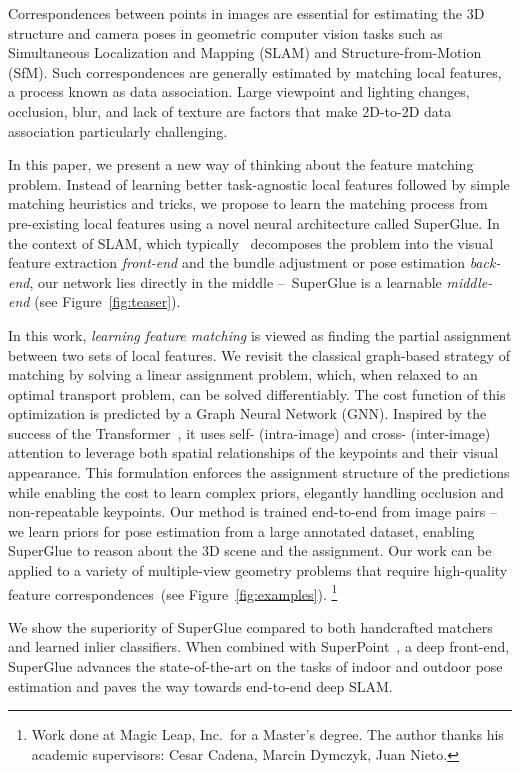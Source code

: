 \documentclass[10pt,twocolumn,letterpaper]{article}
\newcommand\blfootnote[1]{\begingroup
  \renewcommand\thefootnote{}\footnote{#1}\addtocounter{footnote}{-1}\endgroup
}
\renewcommand{\*}[1]{\mathbf{#1}}
\newcommand{\0}{\phantom{0}}
\begin{document}
Correspondences between points in images are essential for estimating the 3D structure and camera poses in geometric computer vision tasks such as Simultaneous Localization and Mapping (SLAM) and Structure-from-Motion (SfM). Such correspondences are generally estimated by matching local features, a process known as data association. Large viewpoint and lighting changes, occlusion, blur, and lack of texture are factors that make 2D-to-2D data association particularly challenging.

In this paper, we present a new way of thinking about the feature matching problem. Instead of learning better task-agnostic local features followed by simple matching heuristics and tricks, we propose to learn the matching process from pre-existing local features using a novel neural architecture called SuperGlue. In the context of SLAM, which typically~\cite{cadena2016past} decomposes the problem into the visual feature extraction \emph{front-end} and the bundle adjustment or pose estimation \emph{back-end}, our network lies directly in the middle --~SuperGlue is a learnable \emph{middle-end} (see Figure~\ref{fig:teaser}).

In this work, \emph{learning feature matching} is viewed as finding the partial assignment between two sets of local features. We revisit the classical graph-based strategy of matching by solving a linear assignment problem, which, when relaxed to an optimal transport problem, can be solved differentiably. The cost function of this optimization is predicted by a Graph Neural Network (GNN). Inspired by the success of the Transformer~\cite{vaswani2017attention}, it uses self- (intra-image) and cross- (inter-image) attention to leverage both spatial relationships of the keypoints and their visual appearance. This formulation enforces the assignment structure of the predictions while enabling the cost to learn complex priors, elegantly handling occlusion and non-repeatable keypoints. Our method is trained end-to-end from image pairs -- we learn priors for pose estimation from a large annotated dataset, enabling SuperGlue to reason about the 3D scene and the assignment. Our work can be applied to a variety of multiple-view geometry problems that require high-quality feature correspondences~(see Figure~\ref{fig:examples}).\blfootnote{Work done at Magic Leap, Inc.\ for a Master's degree. The author thanks his academic supervisors: Cesar Cadena, Marcin Dymczyk, Juan Nieto.} \newpage
We show the superiority of SuperGlue compared to both handcrafted matchers and learned inlier classifiers. When combined with SuperPoint~\cite{superpoint}, a deep front-end, SuperGlue advances the state-of-the-art on the tasks of indoor and outdoor pose estimation and paves the way towards end-to-end deep SLAM.
\end{document}
